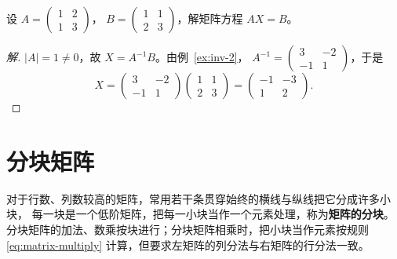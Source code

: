 \begin{example}\label{ex:mat-eq}
设 $A=\begin{pmatrix} 1 & 2 \\ 1 & 3 \end{pmatrix}$，
$B=\begin{pmatrix} 1 & 1 \\ 2 & 3 \end{pmatrix}$，解矩阵方程 $AX=B$。
\end{example}
\begin{proof}[解]
$|A|=1\neq 0$，故 $X=A^{-1}B$。由例~\ref{ex:inv-2}，
$A^{-1}=\begin{pmatrix} 3 & -2 \\ -1 & 1 \end{pmatrix}$，于是
\[
  X=\begin{pmatrix} 3 & -2 \\ -1 & 1 \end{pmatrix}
    \begin{pmatrix} 1 & 1 \\ 2 & 3 \end{pmatrix}
   =\begin{pmatrix} -1 & -3 \\ 1 & 2 \end{pmatrix}.
\]
\end{proof}

\section{分块矩阵}\label{sec:block}

对于行数、列数较高的矩阵，常用若干条贯穿始终的横线与纵线把它分成许多小块，
每一块是一个低阶矩阵，把每一小块当作一个元素处理，称为\textbf{矩阵的分块}。
分块矩阵的加法、数乘按块进行；分块矩阵相乘时，把小块当作元素按规则
\eqref{eq:matrix-multiply} 计算，但要求左矩阵的列分法与右矩阵的行分法一致。

